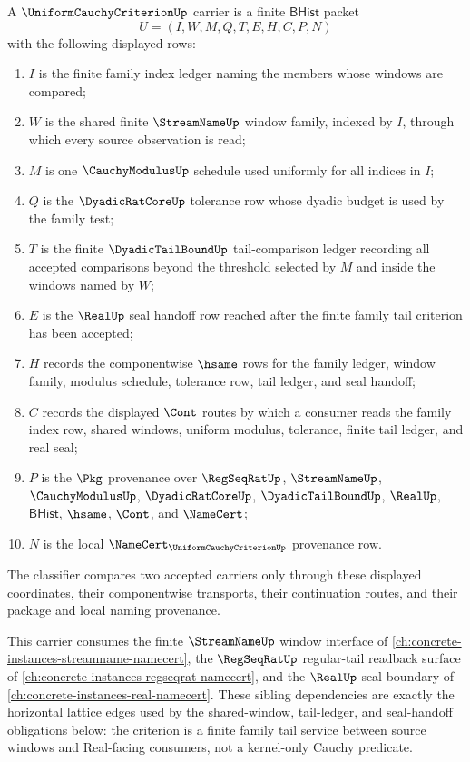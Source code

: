 \begin{definition}
\label{def:uniform-cauchy-criterion-carrier}
A $\UniformCauchyCriterionUp$ carrier is a finite $\mathsf{BHist}$ packet
$$
U=(I,W,M,Q,T,E,H,C,P,N)
$$
with the following displayed rows:
\begin{enumerate}
\item $I$ is the finite family index ledger naming the members whose windows are compared;
\item $W$ is the shared finite $\StreamNameUp$ window family, indexed by $I$, through which every source observation is read;
\item $M$ is one $\CauchyModulusUp$ schedule used uniformly for all indices in $I$;
\item $Q$ is the $\DyadicRatCoreUp$ tolerance row whose dyadic budget is used by the family test;
\item $T$ is the finite $\DyadicTailBoundUp$ tail-comparison ledger recording all accepted comparisons beyond the threshold selected by $M$ and inside the windows named by $W$;
\item $E$ is the $\RealUp$ seal handoff row reached after the finite family tail criterion has been accepted;
\item $H$ records the componentwise $\hsame$ rows for the family ledger, window family, modulus schedule, tolerance row, tail ledger, and seal handoff;
\item $C$ records the displayed $\Cont$ routes by which a consumer reads the family index row, shared windows, uniform modulus, tolerance, finite tail ledger, and real seal;
\item $P$ is the $\Pkg$ provenance over $\RegSeqRatUp$, $\StreamNameUp$, $\CauchyModulusUp$, $\DyadicRatCoreUp$, $\DyadicTailBoundUp$, $\RealUp$, $\mathsf{BHist}$, $\hsame$, $\Cont$, and $\NameCert$;
\item $N$ is the local $\NameCert_{\UniformCauchyCriterionUp}$ provenance row.
\end{enumerate}
The classifier compares two accepted carriers only through these displayed coordinates, their componentwise transports, their continuation routes, and their package and local naming provenance.
\end{definition}

This carrier consumes the finite $\StreamNameUp$ window interface of \autoref{ch:concrete-instances-streamname-namecert}, the $\RegSeqRatUp$ regular-tail readback surface of \autoref{ch:concrete-instances-regseqrat-namecert}, and the $\RealUp$ seal boundary of \autoref{ch:concrete-instances-real-namecert}. These sibling dependencies are exactly the horizontal lattice edges used by the shared-window, tail-ledger, and seal-handoff obligations below: the criterion is a finite family tail service between source windows and Real-facing consumers, not a kernel-only Cauchy predicate.

